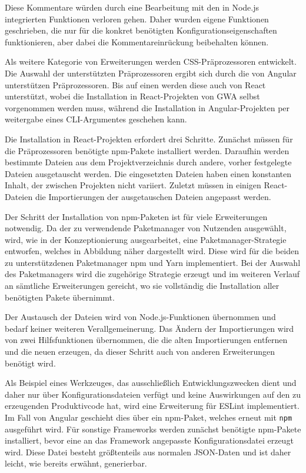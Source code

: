Diese Kommentare würden durch eine Bearbeitung mit den in Node.js integrierten Funktionen verloren gehen. Daher wurden eigene Funktionen geschrieben, die nur für die konkret benötigten Konfigurationseigenschaften funktionieren, aber dabei die Kommentareinrückung beibehalten können.

Als weitere Kategorie von Erweiterungen werden CSS-Präprozessoren entwickelt. Die Auswahl der unterstützten Präprozessoren ergibt sich durch die von Angular unterstützen Präprozessoren. Bis auf einen werden diese auch von React unterstützt, wobei die Installation in React-Projekten von \gls{GWA} selbst vorgenommen werden muss, während die Installation in Angular-Projekten per weitergabe eines \gls{CLI}-Argumentes geschehen kann.

Die Installation in React-Projekten erfordert drei Schritte. Zunächst müssen für die Präprozessoren benötigte \gls{npm}-Pakete installiert werden. Daraufhin werden bestimmte Dateien aus dem Projektverzeichnis durch andere, vorher festgelegte Dateien ausgetauscht werden. Die eingesetzten Dateien haben einen konstanten Inhalt, der zwischen Projekten nicht variiert. Zuletzt müssen in einigen React-Dateien die Importierungen der ausgetauschen Dateien angepasst werden.

Der Schritt der Installation von \gls{npm}-Paketen ist für viele Erweiterungen notwendig. Da der zu verwendende Paketmanager von Nutzenden ausgewählt, wird, wie in der Konzeptionierung ausgearbeitet, eine Paketmanager-Strategie entworfen, welches in Abbildung \missingQuote näher dargestellt wird. Diese wird für die beiden zu unterstützdenen Paketmanager \gls{npm} und Yarn implementiert. Bei der Auswahl des Paketmanagers wird die zugehörige Strategie erzeugt und im weiteren Verlauf an sämtliche Erweiterungen gereicht, wo sie vollständig die Installation aller benötigten Pakete übernimmt.

Der Austausch der Dateien wird von Node.js-Funktionen übernommen und bedarf keiner weiteren Verallgemeinerung. Das Ändern der Importierungen wird von zwei Hilfsfunktionen übernommen, die die alten Importierungen entfernen und die neuen erzeugen, da dieser Schritt auch von anderen Erweiterungen benötigt wird.

Als Beispiel eines Werkzeuges, das ausschließlich Entwicklungszwecken dient und daher nur über Konfigurationsdateien verfügt und keine Auswirkungen auf den zu erzeugenden Produktivcode hat, wird eine Erweiterung für ESLint implementiert. Im Fall von Angular geschieht dies über ein \gls{npm}-Paket, welches erneut mit \verb/npm/ ausgeführt wird. Für sonstige Frameworks werden zunächst benötigte \gls{npm}-Pakete installiert, bevor eine an das Framework angepasste Konfigurationsdatei erzeugt wird. Diese Datei besteht größtenteils aus normalen \gls{JSON}-Daten und ist daher leicht, wie bereits erwähnt, generierbar.

